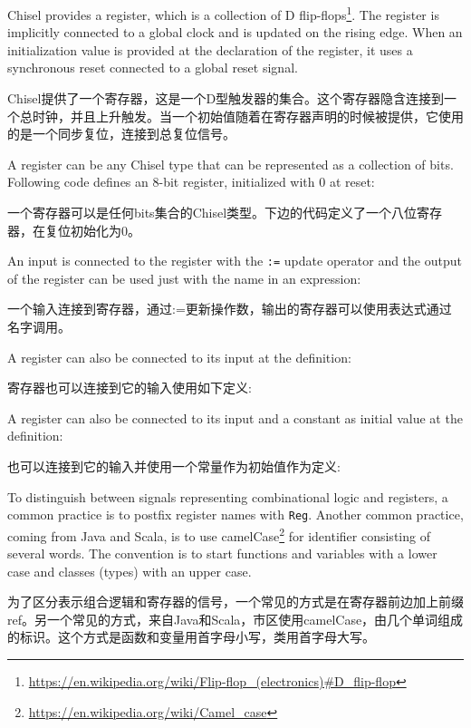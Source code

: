 \documentclass[%
    10pt,
    headinclude, footexclude,
    openright, %
    notitlepage,
    cleardoubleempty,
    headsepline,
    pointlessnumbers,
    bibtotoc, idxtotoc,
    ]{scrbook}
\newcommand{\code}[1]{{\small{\texttt{#1}}}}
\newcommand{\myref}[2]{\href{#1}{#2}}
\renewcommand{\myref}[2]{{#2}{\footnote{\url{#1}}}}
\begin{document}
Chisel provides a register, which is a collection of
\myref{https://en.wikipedia.org/wiki/Flip-flop\_(electronics)\#D\_flip-flop}{D flip-flops}.
The register is implicitly connected to a global clock and is updated on the rising edge.
When an initialization value is provided at the declaration of the register,
it uses a synchronous reset connected to a global reset signal.

Chisel提供了一个寄存器，这是一个D型触发器的集合。这个寄存器隐含连接到一个总时钟，并且上升触发。当一个初始值随着在寄存器声明的时候被提供，它使用的是一个同步复位，连接到总复位信号。

A register can be any Chisel type that can be represented as a collection of bits.
Following code defines an 8-bit register, initialized with 0 at reset:

一个寄存器可以是任何bits集合的Chisel类型。下边的代码定义了一个八位寄存器，在复位初始化为0。




\noindent An input is connected to the register with the \code{:=} update operator and
the output of the register can be used just with the name in an expression:

一个输入连接到寄存器，通过:=更新操作数，输出的寄存器可以使用表达式通过名字调用。


\noindent A register can also be connected to its input at the definition:

寄存器也可以连接到它的输入使用如下定义: 


\noindent A register can also be connected to its input and a constant as
initial value at the definition:

也可以连接到它的输入并使用一个常量作为初始值作为定义:


\noindent To distinguish between signals representing combinational logic and registers,
a common practice is to postfix register names with \code{Reg}.
Another common practice, coming from Java and Scala, is to use
\myref{https://en.wikipedia.org/wiki/Camel_case}{camelCase} for
identifier consisting of several words. The convention is to start
functions and variables with a lower case and classes (types) with
an upper case.

为了区分表示组合逻辑和寄存器的信号，一个常见的方式是在寄存器前边加上前缀ref。另一个常见的方式，来自Java和Scala，市区使用camelCase，由几个单词组成的标识。这个方式是函数和变量用首字母小写，类用首字母大写。
\end{document}
